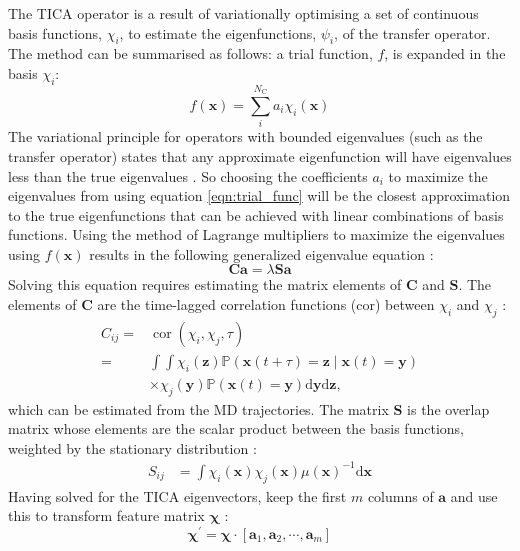 The TICA operator is a result of variationally optimising a set of continuous basis functions, $\chi_{i}$, to estimate the eigenfunctions, $\psi_{i}$, of the transfer operator. The method can be summarised as follows: a trial function, $f$, is expanded in the basis $\chi_{i}$: 
\begin{equation}\label{eqn:trial_func}
    f(\mathbf{x}) = \sum^{N_{\mathrm{C}}}_{i}a_{i}\chi_{i}(\mathbf{x})
\end{equation}
The variational principle for operators with bounded eigenvalues (such as the transfer operator) states that any approximate eigenfunction will have eigenvalues less than the true eigenvalues \cite{noeVariationalApproachModeling2013}. So choosing the coefficients $a_{i}$ to maximize the eigenvalues from using equation \ref{eqn:trial_func} will be the closest approximation to the true eigenfunctions that can be achieved with linear combinations of basis functions. Using the method of Lagrange multipliers to maximize the eigenvalues using $f(\mathbf{x})$ results in the following generalized eigenvalue equation \cite{nuskeVariationalApproachMolecular2014}: \begin{equation}\label{eqn:general_ev_equation}
    \mathbf{C}\mathbf{a} = \lambda \mathbf{S}\mathbf{a}
\end{equation}
Solving this equation requires estimating the matrix elements of $\mathbf{C}$ and $\mathbf{S}$. The elements of $\mathbf{C}$ are the time-lagged correlation functions ($\mathrm{cor}$) between $\chi_{i}$ and $\chi_{j}$ \cite{nuskeVariationalApproachMolecular2014}:
\begin{equation}
    \begin{split}
        C_{ij} =& \operatorname{cor}\left(\chi_{i}, \chi_{j}, \tau\right)\\
        =& \int \int \chi_{i}(\mathbf{z}) \mathbb{P}\left(\mathbf{x}(t+\tau)=\mathbf{z} \mid \mathbf{x}(t)=\mathbf{y}\right) \\
        & \times \chi_{j}(\mathbf{y}) \mathbb{P}\left(\mathbf{x}(t)=\mathbf{y}\right) \mathrm{d} \mathbf{y} \mathrm{d}\mathbf{z},        
    \end{split}
\end{equation}
which can be estimated from the MD trajectories. The matrix $\mathbf{S}$ is the overlap matrix whose elements are the scalar product between the basis functions, weighted by the stationary distribution \cite{nuskeVariationalApproachMolecular2014}:
\begin{align}
    S_{ij} &= \int \chi_{i}(\mathbf{x})\chi_{j}(\mathbf{x})\mu(\mathbf{x})^{-1} \mathrm{d}\mathbf{x}
\end{align}
Having solved for the TICA eigenvectors, keep the first $m$ columns of $\mathbf{a}$ and use this to transform feature matrix $\bm{\chi}$ \cite{perez-hernandezIdentificationSlowMolecular2013a,schwantesImprovementsMarkovState2013}:
\begin{equation}
    \bm{\chi}^{\prime} = \bm{\chi}\cdot[\mathbf{a}_{1}, \mathbf{a}_{2}, \cdots,  \mathbf{a}_{m}]
\end{equation}


